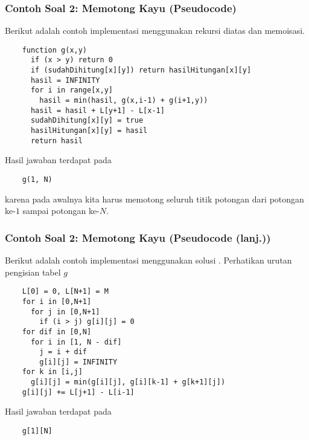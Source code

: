 \begin{frame} [fragile]
\frametitle{Contoh Soal 2: Memotong Kayu (Pseudocode)}
  Berikut adalah contoh implementasi menggunakan rekursi diatas dan memoisasi.
  \begin{lstlisting}
    function g(x,y)
      if (x > y) return 0
      if (sudahDihitung[x][y]) return hasilHitungan[x][y]
      hasil = INFINITY
      for i in range[x,y]
        hasil = min(hasil, g(x,i-1) + g(i+1,y))
      hasil = hasil + L[y+1] - L[x-1]
      sudahDihitung[x][y] = true
      hasilHitungan[x][y] = hasil
      return hasil
  \end{lstlisting}
  Hasil jawaban terdapat pada 
  \begin{lstlisting}
    g(1, N)
  \end{lstlisting}
  karena pada awalnya kita harus memotong seluruh titik potongan dari potongan ke-$1$ sampai potongan ke-$N$.
\end{frame}

\begin{frame} [fragile]
\frametitle{Contoh Soal 2: Memotong Kayu (Pseudocode (lanj.))}
  Berikut adalah contoh implementasi menggunakan solusi . Perhatikan urutan pengisian tabel $g$
  \begin{lstlisting}
    L[0] = 0, L[N+1] = M
    for i in [0,N+1]
      for j in [0,N+1]
        if (i > j) g[i][j] = 0
    for dif in [0,N]
      for i in [1, N - dif]
        j = i + dif
        g[i][j] = INFINITY
	for k in [i,j]
	  g[i][j] = min(g[i][j], g[i][k-1] + g[k+1][j])
	g[i][j] += L[j+1] - L[i-1]
  \end{lstlisting}
  Hasil jawaban terdapat pada
  \begin{lstlisting}
    g[1][N]
  \end{lstlisting}
\end{frame}

